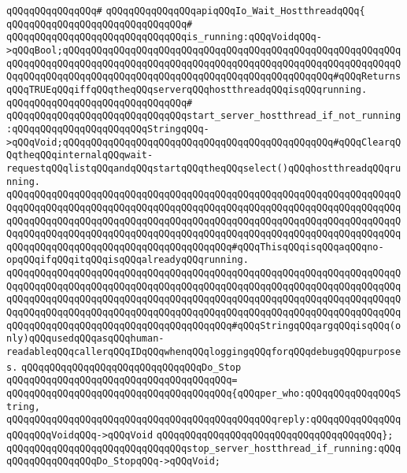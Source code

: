 \verb|qQQqqQQqqQQqqQQq#|\newline
\verb|qQQqqQQqqQQqqQQqapiqQQqIo_Wait_HostthreadqQQq{|\newline
\verb|qQQqqQQqqQQqqQQqqQQqqQQqqQQqqQQq#|\newline
\verb|qQQqqQQqqQQqqQQqqQQqqQQqqQQqqQQqis_running:qQQqVoidqQQq->qQQqBool;qQQqqQQqqQQqqQQqqQQqqQQqqQQqqQQqqQQqqQQqqQQqqQQqqQQqqQQqqQQqqQQqqQQqqQQqqQQqqQQqqQQqqQQqqQQqqQQqqQQqqQQqqQQqqQQqqQQqqQQqqQQqqQQqqQQqqQQqqQQqqQQqqQQqqQQqqQQqqQQqqQQqqQQqqQQqqQQqqQQqqQQqqQQq#qQQqReturnsqQQqTRUEqQQqiffqQQqtheqQQqserverqQQqhostthreadqQQqisqQQqrunning.|\newline
\verb|qQQqqQQqqQQqqQQqqQQqqQQqqQQqqQQq#|\newline
\verb|qQQqqQQqqQQqqQQqqQQqqQQqqQQqqQQqstart_server_hostthread_if_not_running:qQQqqQQqqQQqqQQqqQQqqQQqStringqQQq->qQQqVoid;qQQqqQQqqQQqqQQqqQQqqQQqqQQqqQQqqQQqqQQqqQQqqQQq#qQQqClearqQQqtheqQQqinternalqQQqwait-requestqQQqlistqQQqandqQQqstartqQQqtheqQQqselect()qQQqhostthreadqQQqrunning.|\newline
\verb|qQQqqQQqqQQqqQQqqQQqqQQqqQQqqQQqqQQqqQQqqQQqqQQqqQQqqQQqqQQqqQQqqQQqqQQqqQQqqQQqqQQqqQQqqQQqqQQqqQQqqQQqqQQqqQQqqQQqqQQqqQQqqQQqqQQqqQQqqQQqqQQqqQQqqQQqqQQqqQQqqQQqqQQqqQQqqQQqqQQqqQQqqQQqqQQqqQQqqQQqqQQqqQQqqQQqqQQqqQQqqQQqqQQqqQQqqQQqqQQqqQQqqQQqqQQqqQQqqQQqqQQqqQQqqQQqqQQqqQQqqQQqqQQqqQQqqQQqqQQqqQQqqQQqqQQqqQQqqQQq#qQQqThisqQQqisqQQqaqQQqno-opqQQqifqQQqitqQQqisqQQqalreadyqQQqrunning.|\newline
\verb|qQQqqQQqqQQqqQQqqQQqqQQqqQQqqQQqqQQqqQQqqQQqqQQqqQQqqQQqqQQqqQQqqQQqqQQqqQQqqQQqqQQqqQQqqQQqqQQqqQQqqQQqqQQqqQQqqQQqqQQqqQQqqQQqqQQqqQQqqQQqqQQqqQQqqQQqqQQqqQQqqQQqqQQqqQQqqQQqqQQqqQQqqQQqqQQqqQQqqQQqqQQqqQQqqQQqqQQqqQQqqQQqqQQqqQQqqQQqqQQqqQQqqQQqqQQqqQQqqQQqqQQqqQQqqQQqqQQqqQQqqQQqqQQqqQQqqQQqqQQqqQQqqQQqqQQqqQQqqQQq#qQQqStringqQQqargqQQqisqQQq(only)qQQqusedqQQqasqQQqhuman-readableqQQqcallerqQQqIDqQQqwhenqQQqloggingqQQqforqQQqdebugqQQqpurposes.|\newline
\verb|qQQqqQQqqQQqqQQqqQQqqQQqqQQqqQQqDo_Stop|\newline
\verb|qQQqqQQqqQQqqQQqqQQqqQQqqQQqqQQqqQQqqQQq=|\newline
\verb|qQQqqQQqqQQqqQQqqQQqqQQqqQQqqQQqqQQqqQQq{qQQqper_who:qQQqqQQqqQQqqQQqString,|\newline
\verb|qQQqqQQqqQQqqQQqqQQqqQQqqQQqqQQqqQQqqQQqqQQqqQQqreply:qQQqqQQqqQQqqQQqqQQqqQQqVoidqQQq->qQQqVoid|\newline
\verb|qQQqqQQqqQQqqQQqqQQqqQQqqQQqqQQqqQQqqQQq};|\newline
\verb|qQQqqQQqqQQqqQQqqQQqqQQqqQQqqQQqstop_server_hostthread_if_running:qQQqqQQqqQQqqQQqqQQqDo_StopqQQq->qQQqVoid;|\newline
